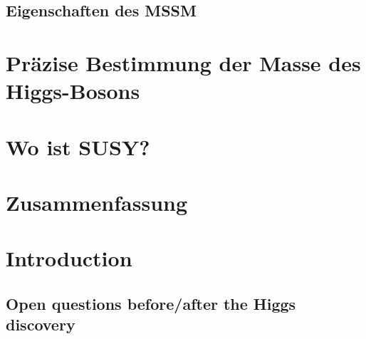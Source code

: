 \documentclass[hyperref={pdfpagelabels=false},ngerman]{beamer}
\begin{document}
\subsection{Eigenschaften des MSSM}


\section{Präzise Bestimmung der Masse des Higgs-Bosons}


\section{Wo ist SUSY?}


\section{Zusammenfassung}


\section{Introduction}
\subsection{Open questions before/after the Higgs discovery}
\end{document}
